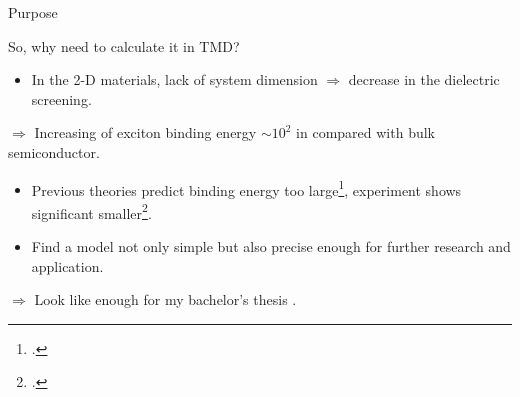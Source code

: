 \documentclass{beamer}
\begin{document}
\begin{frame}{Purpose}
\begin{center}
	So, why need to calculate it in TMD?
\end{center}
\begin{itemize}
\item In the 2-D materials, lack of system dimension $\Rightarrow$ decrease in the dielectric screening.
\end{itemize}
$\Rightarrow$ Increasing of exciton binding energy \(\sim 10^2\) in compared with bulk semiconductor.\\
\begin{itemize}
\item Previous theories predict binding energy too large\footcite{ramasubramaniam_large_2012,qiu_optical_2013}, experiment shows significant smaller\footcite{zhang_absorption_2014}.
\item Find a model not only simple but also precise enough for further research and application.
\end{itemize}
$\Rightarrow$ Look like enough for my bachelor's thesis \smiley{}.
\end{frame}
\end{document}
